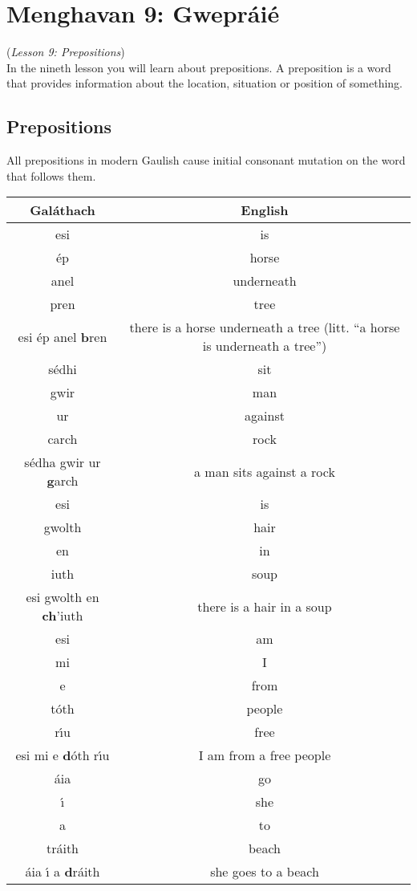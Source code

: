 \section{Menghavan 9: Gwepr\'{a}i\'{e}}
(\textit{Lesson 9: Prepositions})\\

In the nineth lesson you will learn about prepositions. A preposition is a word that provides information about the location, situation or position of something.

\subsection{Prepositions}

All prepositions in modern Gaulish cause initial consonant mutation on the word that follows them.
\begin{table}[H]
\centering
\begin{tabu}{c|c}
  \textbf{Gal\'{a}thach} & \textbf{English}\\
  \toprule
  esi & is\\
  \'{e}p & horse\\
  anel & underneath\\
  pren & tree\\
  esi \'{e}p anel \textbf{b}ren & there is a horse underneath a tree (litt. ``a horse is underneath a tree'')\\
  \midrule
  s\'{e}dhi & sit\\
  gwir & man\\
  ur & against\\
  carch & rock\\
  s\'{e}dha gwir ur \textbf{g}arch & a man sits against a rock\\
  \midrule
  esi & is\\
  gwolth & hair\\
  en & in\\
  iuth & soup\\
  esi gwolth en \textbf{ch}'iuth & there is a hair in a soup\\
  \midrule
  esi & am\\
  mi & I\\
  e & from\\
  t\'{o}th & people\\
  r\'{\i}u & free\\
  esi mi e \textbf{d}\'{o}th r\'{\i}u & I am from a free people\\
  \midrule
  \'{a}ia & go\\
  \'{\i} & she\\
  a & to\\
  tr\'{a}ith & beach\\
  \'{a}ia \'{\i} a \textbf{d}r\'{a}ith & she goes to a beach
\end{tabu}
\label{examples_prepositions}
\end{table}

